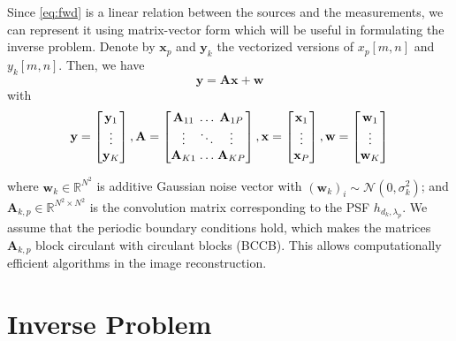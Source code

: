 \documentclass{article}
\newcommand{\R}{\mathbb{R}}
\renewcommand{\vec}[1]{\ensuremath{\mathbf{#1}}}
\providecommand{\vx}{\vec{x}}
\providecommand{\vy}{\vec{y}}
\providecommand{\vw}{\vec{w}}
\providecommand{\vA}{\vec{A}}
\begin{document}
Since \eqref{eq:fwd} is a linear relation between the sources and the
measurements, we can represent it using matrix-vector form which will be useful
in formulating the inverse problem. Denote by $\vx_p$ and $\vy_k$ the vectorized
versions of $x_p[m,n]$ and $y_k[m,n]$. Then, we have
\begin{equation}
\vy = \vec A \vx + \vec w
\label{eq:mtx-vec}
\end{equation}
with
\begin{equation}
\vy = \begin{bmatrix}
\vy_1 \\ \vdots \\ \vy_K
\end{bmatrix}, \vA = \begin{bmatrix}
\vA_{11} \hspace{-.1 in}& \dots \hspace{-.1 in}& \vA_{1P} \\
\vdots \hspace{-.1 in}& \ddots \hspace{-.1 in}& \vdots \\
\vA_{K1} \hspace{-.1 in}& \dots \hspace{-.1 in}& \vA_{KP}
\end{bmatrix}, \vx = \begin{bmatrix}
\vx_1 \\ \vdots \\ \vx_P
\end{bmatrix}, \vw = \begin{bmatrix}
\vw_1 \\ \vdots \\ \vw_K
\end{bmatrix}
\end{equation}

where $\vw_k \in \R^{N^2}$ is additive Gaussian noise vector with $(\vw_k)_i
\sim \mathcal N (0, \sigma_k^2)$; and $\vA_{k,p} \in \R^{N^2 \times N^2}$ is the
convolution matrix corresponding to the PSF $h_{d_k,\lambda_p}$. We assume that
the periodic boundary conditions hold, which makes the matrices $\vA_{k,p}$
block circulant with circulant blocks (BCCB). This allows computationally
efficient algorithms in the image reconstruction.


\section{Inverse Problem}
\label{sec:pagestyle}
\end{document}

